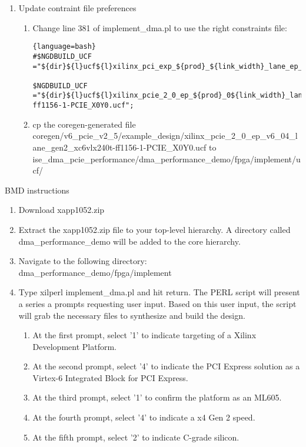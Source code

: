 \begin{enumerate}
\item Update contraint file preferences
\begin{enumerate}
\item Change line 381 of implement\_dma.pl to use the right constraints file:
\begin{lstlisting}{language=bash}
#$NGDBUILD_UCF ="${dir}${l}ucf${l}xilinx_pci_exp_${prod}_${link_width}_lane_ep_${board}${gen_speed}.ucf"; 

$NGDBUILD_UCF ="${dir}${l}ucf${l}xilinx_pcie_2_0_ep_${prod}_0${link_width}_lane_${gen_speed}_xc6vlx240t-ff1156-1-PCIE_X0Y0.ucf"; 
\end{lstlisting}

\item cp the coregen-generated file coregen/v6\_pcie\_v2\_5/example\_design/xilinx\_pcie\_2\_0\_ep\_v6\_04\_lane\_gen2\_xc6vlx240t-ff1156-1-PCIE\_X0Y0.ucf to 
  ise\_dma\_pcie\_performance/dma\_performance\_demo/fpga/implement/ucf/

\end{enumerate}
\end{enumerate}
BMD instructions
\begin{enumerate}

\item Download xapp1052.zip
\item Extract the xapp1052.zip file to your top-level hierarchy. A directory called dma\_performance\_demo will be added to the core hierarchy.
\item Navigate to the following directory:  
 dma\_performance\_demo/fpga/implement
\item Type xilperl implement\_dma.pl and hit return.  
 The PERL script will present a series a prompts requesting user input. Based on this user input, the script will grab the necessary files to synthesize and build the design.
\begin{enumerate}
\item At the first prompt, select '1' to indicate targeting of a Xilinx Development Platform.
\item At the second prompt, select '4' to indicate the PCI Express solution as a Virtex-6 Integrated Block for PCI Express.
\item At the third prompt, select '1' to confirm the platform as an ML605.
\item At the fourth prompt, select '4' to indicate a x4 Gen 2 speed.
\item At the fifth prompt, select '2' to indicate C-grade silicon.

\end{enumerate}

\end{enumerate}
